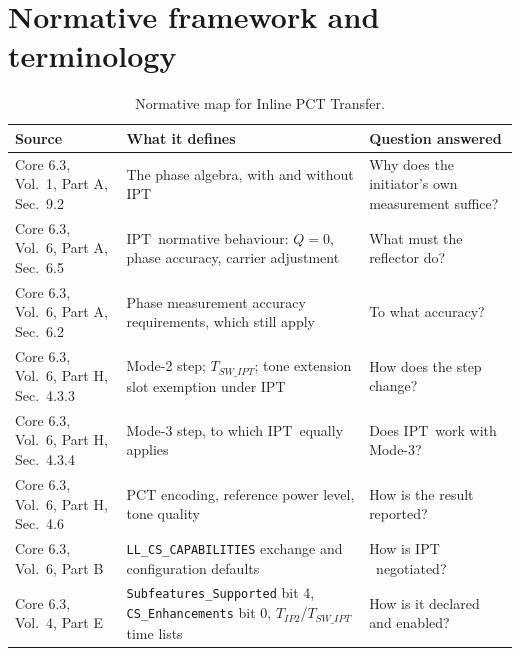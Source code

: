 \documentclass[11pt,a4paper]{article}
\newcommand{\PCT}{\ensuremath{\mathrm{PCT}}}
\newcommand{\IPT}{\ensuremath{\mathrm{IPT}}}
\newcommand{\Tswipt}{T_{SW\_IPT}}
\newcommand{\Tiptwo}{T_{IP2}}
\newcommand{\code}[1]{\texttt{\small #1}}
\begin{document}
\section{Normative framework and terminology}

\begin{table}[h]
\caption{Normative map for Inline PCT Transfer.}
\label{tab:normmap}
\centering\small
\begin{tabular}{@{}L{42mm}L{51mm}L{51mm}@{}}
\toprule
Source & What it defines & Question answered \\
\midrule
Core 6.3, Vol.\ 1, Part A, Sec.\ 9.2 & The phase algebra, with and without \IPT & Why does the initiator's own measurement suffice? \\
Core 6.3, Vol.\ 6, Part A, Sec.\ 6.5 & \IPT\ normative behaviour: $Q=0$, phase accuracy, carrier adjustment & What must the reflector do? \\
Core 6.3, Vol.\ 6, Part A, Sec.\ 6.2 & Phase measurement accuracy requirements, which still apply & To what accuracy? \\
Core 6.3, Vol.\ 6, Part H, Sec.\ 4.3.3 & Mode-2 step; $\Tswipt$; tone extension slot exemption under \IPT & How does the step change? \\
Core 6.3, Vol.\ 6, Part H, Sec.\ 4.3.4 & Mode-3 step, to which \IPT\ equally applies & Does \IPT\ work with Mode-3? \\
Core 6.3, Vol.\ 6, Part H, Sec.\ 4.6 & $\PCT$ encoding, reference power level, tone quality & How is the result reported? \\
Core 6.3, Vol.\ 6, Part B & \code{LL\_CS\_CAPABILITIES} exchange and configuration defaults & How is \IPT\ negotiated? \\
Core 6.3, Vol.\ 4, Part E & \code{Subfeatures\_Supported} bit 4, \code{CS\_Enhancements} bit 0, $\Tiptwo$/$\Tswipt$ time lists & How is it declared and enabled? \\
\bottomrule
\end{tabular}
\end{table}
\end{document}
